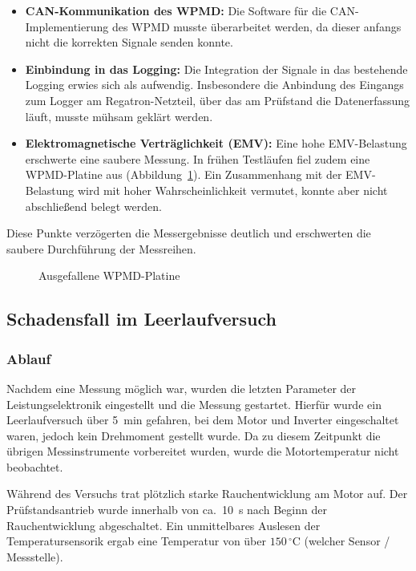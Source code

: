\begin{itemize}
    \item \textbf{CAN-Kommunikation des WPMD:} Die Software für die CAN-Implementierung des WPMD musste überarbeitet werden, da dieser anfangs nicht die korrekten Signale senden konnte.
    \item \textbf{Einbindung in das Logging:} Die Integration der Signale in das bestehende Logging erwies sich als aufwendig. Insbesondere die Anbindung des Eingangs zum Logger am Regatron-Netzteil, über das am Prüfstand die Datenerfassung läuft, musste mühsam geklärt werden.
    \item \textbf{Elektromagnetische Verträglichkeit (EMV):} Eine hohe EMV-Belastung erschwerte eine saubere Messung. In frühen Testläufen fiel zudem eine WPMD-Platine aus (Abbildung~\ref{fig:wpmd_defekt}). Ein Zusammenhang mit der EMV-Belastung wird mit hoher Wahrscheinlichkeit vermutet, konnte aber nicht abschließend belegt werden.
\end{itemize}

Diese Punkte verzögerten die Messergebnisse deutlich und erschwerten die saubere Durchführung der Messreihen.

\begin{figure}[htbp]
    \centering
    \caption{Ausgefallene WPMD-Platine}
    \label{fig:wpmd_defekt}
\end{figure}

\subsection{Schadensfall im Leerlaufversuch}
\label{sec:schadensfall}

\subsubsection{Ablauf}
\label{subsec:schadensablauf}

Nachdem eine Messung möglich war, wurden die letzten Parameter der Leistungselektronik eingestellt und die Messung gestartet. Hierfür wurde ein Leerlaufversuch über \SI{5}{min} gefahren, bei dem Motor und Inverter eingeschaltet waren, jedoch kein Drehmoment gestellt wurde. Da zu diesem Zeitpunkt die übrigen Messinstrumente vorbereitet wurden, wurde die Motortemperatur nicht beobachtet.

Während des Versuchs trat plötzlich starke Rauchentwicklung am Motor auf. Der Prüfstandsantrieb wurde innerhalb von ca.\ \SI{10}{s} nach Beginn der Rauchentwicklung abgeschaltet. %
Ein unmittelbares Auslesen der Temperatursensorik ergab eine Temperatur von über $150\,^\circ\mathrm{C}$ (welcher Sensor / Messstelle).

